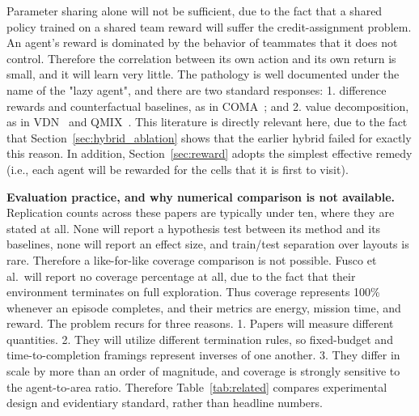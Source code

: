 \documentclass[a4paper, 10pt, conference]{ieeeconf}
\begin{document}
Parameter sharing alone will not be sufficient, due to the fact that a
shared policy trained on a shared team reward will suffer the
credit-assignment problem. An agent's reward is dominated by the
behavior of teammates that it does not control. Therefore the
correlation between its own action and its own return is small, and it
will learn very little. The pathology is well documented under the
name of the "lazy agent", and there are two standard responses: 1.
difference rewards and counterfactual baselines, as in
COMA~\cite{foerster2018}; and 2. value decomposition, as in
VDN~\cite{sunehag2018} and QMIX~\cite{rashid2018}. This literature is
directly relevant here, due to the fact that
Section~\ref{sec:hybrid_ablation} shows that the earlier hybrid failed
for exactly this reason. In addition, Section~\ref{sec:reward} adopts
the simplest effective remedy (i.e., each agent will be rewarded for
the cells that it is first to visit).

\textbf{Evaluation practice, and why numerical comparison is not
available.} Replication counts across these papers are typically under
ten, where they are stated at all. None will report a hypothesis test
between its method and its baselines, none will report an effect size,
and train/test separation over layouts is rare. Therefore a
like-for-like coverage comparison is not possible. Fusco et al.\ will
report no coverage percentage at all, due to the fact that their
environment terminates on full exploration. Thus coverage represents
100\% whenever an episode completes, and their metrics are energy,
mission time, and reward. The problem recurs for three reasons. 1.
Papers will measure different quantities. 2. They will utilize
different termination rules, so fixed-budget and time-to-completion
framings represent inverses of one another. 3. They differ in scale by
more than an order of magnitude, and coverage is strongly sensitive to
the agent-to-area ratio. Therefore Table~\ref{tab:related} compares
experimental design and evidentiary standard, rather than headline
numbers.
\end{document}
